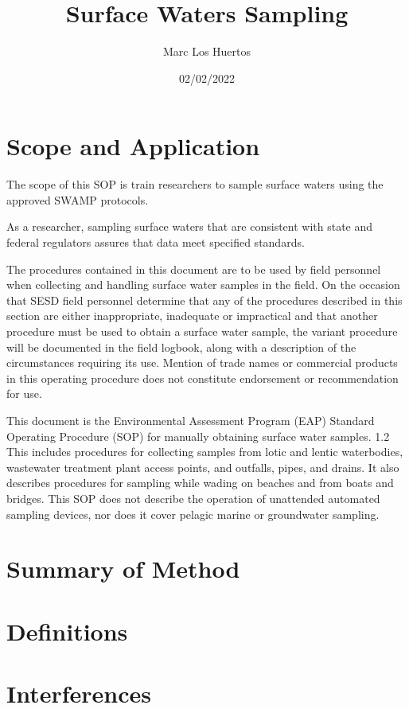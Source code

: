 \documentclass[12pt]{../SOP3_beta}\usepackage[]{graphicx}\usepackage[]{xcolor}
\title{Surface Waters Sampling}
\date{02/02/2022}
\author{Marc Los Huertos}
\begin{document}
\maketitle

\section{Scope and Application}

\NP The scope of this SOP is train researchers to sample surface waters using the approved SWAMP protocols. 

\NP As a researcher, sampling surface waters that are consistent with state and federal regulators assures that data meet specified standards.

The procedures contained in this document are to be used by field personnel when collecting and handling surface water samples in the field.  On the occasion that SESD field personnel determine that any of the procedures described in this section are either inappropriate, inadequate or impractical and that another procedure must be used to obtain a surface water sample, the variant procedure will be documented in the field logbook, along with a description of the circumstances requiring its use.  Mention of trade names or commercial products in this operating procedure does not constitute endorsement or recommendation for use.

This document is the Environmental Assessment Program (EAP) Standard Operating Procedure (SOP) for manually obtaining surface water samples.  1.2 This includes procedures for collecting samples from lotic and lentic waterbodies, wastewater treatment plant access points, and outfalls, pipes, and drains. It also describes procedures for sampling while wading on beaches and from boats and bridges. This SOP does not describe the operation of unattended automated sampling devices, nor does it cover pelagic marine or groundwater sampling. 

\section{Summary of Method}

\section{Definitions}



\section{Interferences}
\end{document}
